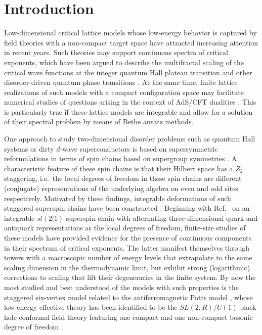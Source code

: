 \documentclass[12pt]{article}
\numberwithin{equation}{section}
\begin{document}
	\section{Introduction}
	Low-dimensional critical lattice models whose low-energy behavior is
	captured by field theories with a non-compact target space have
	attracted increasing attention in recent years.  Such theories may
	support continuous spectra of critical exponents, which have been
	argued to describe the multifractal scaling of the critical wave
	functions at the integer quantum Hall plateau transition and other
	disorder-driven quantum phase transitions \cite{Zirn19,EvMi08}. At the
	same time, finite lattice realizations of such models with a compact
	configuration space may facilitate numerical studies of questions
	arising in the context of AdS/CFT dualities \cite{Scho06}.  This is
	particularly true if these lattice models are integrable and allow for
	a solution of their spectral problem by means of Bethe ansatz methods.
	
	One approach to study two-dimensional disorder problems such as quantum
	Hall systems or dirty $d$-wave superconductors is based on
	supersymmetric reformulations in terms of spin chains based on supergroup
	symmetries \cite{Zirn94,KoMa97,SeFi99,Gruz99}.  A characteristic
	feature of these spin chains is that their Hilbert space has a
	$Z_2$ staggering, i.e.\ the local degrees of freedom in these
	spin chains are different (conjugate) representations of the
	underlying algebra on even and odd sites respectively.  Motivated by these findings, integrable deformations of such staggered superspin chains have been constructed
	\cite{Gade98,LiFo99,Gade99,EsFS05,FrMa11,FrMa12}.  Beginning
	with Ref.~\cite{EsFS05} on an integrable $sl(2|1)$ superspin chain
	with alternating three-dimensional quark and antiquark representations as the local
	degrees of freedom, finite-size studies of these models have provided evidence for the
	presence of continuous components in their spectrum of critical exponents.  The latter manifest themselves through towers with a macroscopic number of energy levels that extrapolate to the same scaling dimension in the thermodynamic limit, but exhibit strong (logarithmic) corrections to scaling that lift their degeneracies in the finite system.
	By now the most studied and best understood of the models with such properties
	is the staggered six-vertex model related to the antiferromagnetic
	Potts model \cite{IkJS08,IkJS12,CaIk13,FrSe14,BaKL21,BKKL21a}, whose
	low energy effective theory has been identified to be the
	$SL(2,{R})/U(1)$ black hole conformal field theory featuring one compact and one non-compact bosonic degree of freedom \cite{Witten91}.
	
\end{document}
